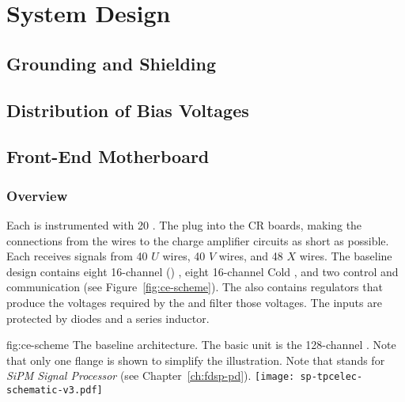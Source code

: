 \section{System Design}
\label{sec:fdsp-tpcelec-design}

\subsection{Grounding and Shielding}
\label{sec:fdsp-tpcelec-design-grounding}

\subsection{Distribution of Bias Voltages}
\label{sec:fdsp-tpcelec-design-bias}

\subsection{Front-End Motherboard}
\label{sec:fdsp-tpcelec-design-femb}

\subsubsection{Overview}
\label{sec:fdsp-tpcelec-design-femb-overview}

Each  is instrumented with \num{20} %
.
The  plug into the  CR boards, making the connections from the wires to the charge amplifier circuits as short as possible.
Each  receives signals from \num{40} $U$ wires, \num{40} $V$ wires, and \num{48} $X$ wires.
The baseline  design contains eight \num{16}-channel  () , eight \num{16}-channel Cold  , and two  control and communication  (see Figure~\ref{fig:ce-scheme}).
The  also contains regulators that produce the voltages required by the  and 
filter those voltages.
The  inputs are protected by diodes and a series inductor.

\begin{dunefigure}
{fig:ce-scheme}
{The baseline  architecture. The basic unit is the \num{128}-channel . Note that only one  flange is shown to simplify the illustration. Note that  stands for \textit{SiPM Signal Processor} (see Chapter~\ref{ch:fdsp-pd}).}
\texttt{[image: sp-tpcelec-schematic-v3.pdf]}
\end{dunefigure}

